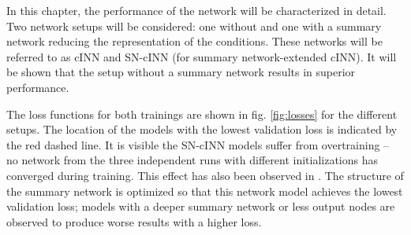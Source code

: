 \label{ch:inference}

In this chapter, the performance of the network will be characterized in detail. Two network setups will be considered: one without and one with a summary network reducing the representation of the conditions. These networks will be referred to as cINN and SN-cINN (for summary network-extended cINN). It will be shown that the setup without a summary network results in superior performance. 


The loss functions for both trainings are shown in fig. \ref{fig:losses} for the different setups. The location of the models with the lowest validation loss is indicated by the red dashed line. It is visible the SN-cINN models suffer from overtraining -- no network from the three independent runs with different initializations has converged during training. This effect has also been observed in \cite{Ksoll_2020}. The structure of the summary network is optimized so that this network model achieves the lowest validation loss; models with a deeper summary network or less output nodes are observed to produce worse results with a higher loss.

